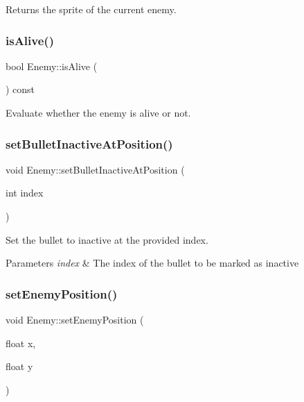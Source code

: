 Returns the sprite of the current enemy. 

\mbox{\label{class_enemy_a2801f42818600b19a7381dd2d1635af8}} 
\subsubsection{\texorpdfstring{is\+Alive()}{isAlive()}}
{\footnotesize\ttfamily bool Enemy\+::is\+Alive (\begin{DoxyParamCaption}{ }\end{DoxyParamCaption}) const}



Evaluate whether the enemy is alive or not. 

\mbox{\label{class_enemy_a02e1cacf8fad39bbcc28271a53637024}} 
\subsubsection{\texorpdfstring{set\+Bullet\+Inactive\+At\+Position()}{setBulletInactiveAtPosition()}}
{\footnotesize\ttfamily void Enemy\+::set\+Bullet\+Inactive\+At\+Position (\begin{DoxyParamCaption}\item[{int}]{index }\end{DoxyParamCaption})}



Set the bullet to inactive at the provided index. 


\begin{DoxyParams}{Parameters}
{\em index} & The index of the bullet to be marked as inactive \\
\hline
\end{DoxyParams}
\mbox{\label{class_enemy_a6a83e4ff9dab297dbec1644dcc9152c6}} 
\subsubsection{\texorpdfstring{set\+Enemy\+Position()}{setEnemyPosition()}}
{\footnotesize\ttfamily void Enemy\+::set\+Enemy\+Position (\begin{DoxyParamCaption}\item[{float}]{x,  }\item[{float}]{y }\end{DoxyParamCaption})\hspace{0.3cm}{\ttfamily [inline]}}

